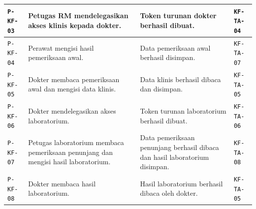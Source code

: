 \begin{longtable}{|p{}|p{}|p{}|p{}|}
	\texttt{P-KF-03}                                                                   &
	Petugas RM mendelegasikan akses klinis kepada dokter.                              &
	Token turunan dokter berhasil dibuat.                                              &
	\texttt{KF-TA-04}                                                                                                                          \\ \hline

	\texttt{P-KF-04}                                                                   &
	Perawat mengisi hasil pemeriksaan awal.                                            &
	Data pemeriksaan awal berhasil disimpan.                                           &
	\texttt{KF-TA-07}                                                                                                                          \\ \hline

	\texttt{P-KF-05}                                                                   &
	Dokter membaca pemeriksaan awal dan mengisi data klinis.                           &
	Data klinis berhasil dibaca dan disimpan.                                          &
	\texttt{KF-TA-05}                                                                                                                          \\ \hline

	\texttt{P-KF-06}                                                                   &
	Dokter mendelegasikan akses laboratorium.                                          &
	Token turunan laboratorium berhasil dibuat.                                        &
	\texttt{KF-TA-06}                                                                                                                          \\ \hline

	\texttt{P-KF-07}                                                                   &
	Petugas laboratorium membaca pemeriksaan penunjang dan mengisi hasil laboratorium. &
	Data pemeriksaan penunjang berhasil dibaca dan hasil laboratorium disimpan.        &
	\texttt{KF-TA-08}                                                                                                                          \\ \hline

	\texttt{P-KF-08}                                                                   &
	Dokter membaca hasil laboratorium.                                                 &
	Hasil laboratorium berhasil dibaca oleh dokter.                                    &
	\texttt{KF-TA-05}                                                                                                                          \\ \hline


\end{longtable}
